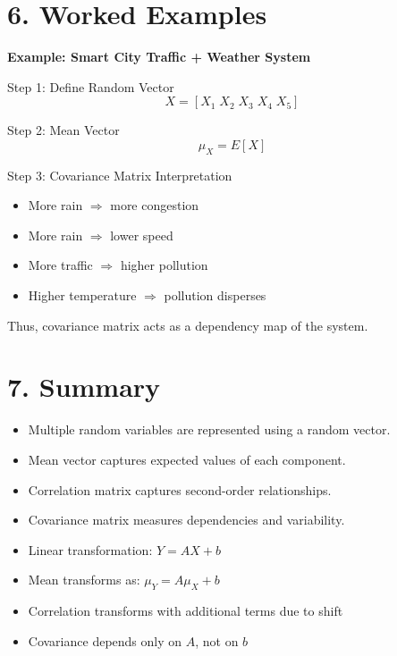 \documentclass[12pt]{article}
\begin{document}
\section*{6. Worked Examples}

\textbf{Example: Smart City Traffic + Weather System}

Step 1: Define Random Vector
\[
X = [X_1 \; X_2 \; X_3 \; X_4 \; X_5]
\]

Step 2: Mean Vector
\[
\mu_X = E[X]
\]

Step 3: Covariance Matrix Interpretation

\begin{itemize}
\item More rain $\Rightarrow$ more congestion
\item More rain $\Rightarrow$ lower speed
\item More traffic $\Rightarrow$ higher pollution
\item Higher temperature $\Rightarrow$ pollution disperses
\end{itemize}

Thus, covariance matrix acts as a dependency map of the system.

\section*{7. Summary}

\begin{itemize}
\item Multiple random variables are represented using a random vector.
\item Mean vector captures expected values of each component.
\item Correlation matrix captures second-order relationships.
\item Covariance matrix measures dependencies and variability.
\item Linear transformation: $Y = AX + b$
\item Mean transforms as: $\mu_Y = A\mu_X + b$
\item Correlation transforms with additional terms due to shift
\item Covariance depends only on $A$, not on $b$
\end{itemize}
\end{document}
